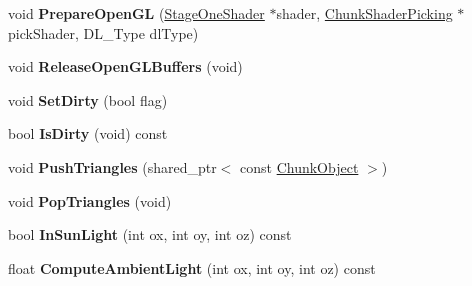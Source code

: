 \begin{DoxyCompactItemize}
\item 
\hypertarget{structchunk_a766f32b9d39ba88c213dc0e9f7ddf41d}{void {\bfseries \-Prepare\-Open\-G\-L} (\hyperlink{classStageOneShader}{\-Stage\-One\-Shader} $\ast$shader, \hyperlink{classChunkShaderPicking}{\-Chunk\-Shader\-Picking} $\ast$pick\-Shader, \-D\-L\-\_\-\-Type dl\-Type)}\label{structchunk_a766f32b9d39ba88c213dc0e9f7ddf41d}

\item 
\hypertarget{structchunk_a9a3ec4f479c2408fd267180bc6b49121}{void {\bfseries \-Release\-Open\-G\-L\-Buffers} (void)}\label{structchunk_a9a3ec4f479c2408fd267180bc6b49121}

\item 
\hypertarget{structchunk_a91df6c54dd57941c5cbeef65c399679a}{void {\bfseries \-Set\-Dirty} (bool flag)}\label{structchunk_a91df6c54dd57941c5cbeef65c399679a}

\item 
\hypertarget{structchunk_acb791009026349f4ad4e0935f1a8d71b}{bool {\bfseries \-Is\-Dirty} (void) const }\label{structchunk_acb791009026349f4ad4e0935f1a8d71b}

\item 
\hypertarget{structchunk_adfda9e9e70778685008b19d4a373f721}{void {\bfseries \-Push\-Triangles} (shared\-\_\-ptr$<$ const \hyperlink{classChunkObject}{\-Chunk\-Object} $>$)}\label{structchunk_adfda9e9e70778685008b19d4a373f721}

\item 
\hypertarget{structchunk_ad792a054666a8da861e980ce0d6ece95}{void {\bfseries \-Pop\-Triangles} (void)}\label{structchunk_ad792a054666a8da861e980ce0d6ece95}

\item 
\hypertarget{structchunk_a24e1ec6f965b0f404bbb7525a4887502}{bool {\bfseries \-In\-Sun\-Light} (int ox, int oy, int oz) const }\label{structchunk_a24e1ec6f965b0f404bbb7525a4887502}

\item 
\hypertarget{structchunk_af1b94b9b6a7dbd0c91da5ac5b5c351e3}{float {\bfseries \-Compute\-Ambient\-Light} (int ox, int oy, int oz) const }\label{structchunk_af1b94b9b6a7dbd0c91da5ac5b5c351e3}

\end{DoxyCompactItemize}
